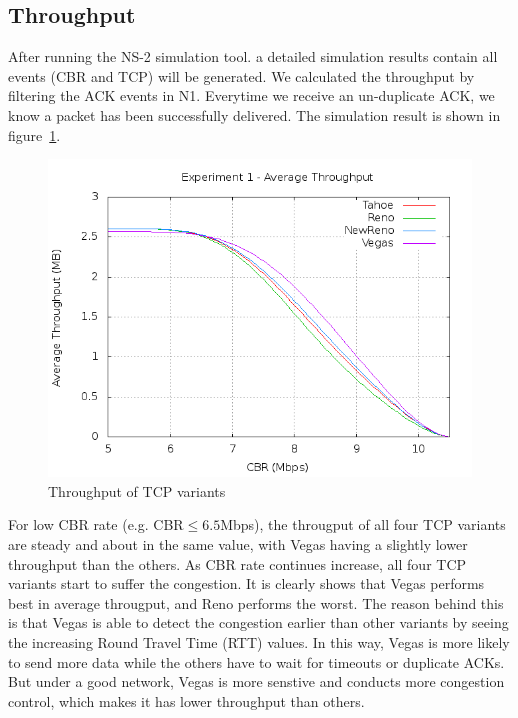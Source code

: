\documentclass[10pt, conference]{lib/IEEEtran}
\begin{document}
\subsection{Throughput}
After running the NS-2 simulation tool. a detailed simulation results 
contain all events (CBR and TCP) will be generated. We calculated the
 throughput by filtering the ACK events in N1. Everytime we receive an
 un-duplicate ACK, we know a packet has been successfully delivered. 
 The simulation result is shown in figure~\ref{fig:exp1_thp}.
\begin{figure}[!htb]
    \centering
    \includegraphics[width=0.9\linewidth]{plot/exp1-thp.png}
    \caption{Throughput of TCP variants}
    \label{fig:exp1_thp}
\end{figure}
For low CBR rate (e.g. CBR$ \le 6.5$Mbps), the througput of all four TCP 
variants are steady and about in the same value, with Vegas having a 
slightly lower throughput than the others. As CBR rate continues 
increase, all four TCP variants start to suffer the congestion. It is 
clearly shows that Vegas performs best in average througput, and Reno
performs the worst. The reason behind this is that Vegas is able to 
detect the congestion earlier than other variants by seeing the 
increasing Round Travel Time (RTT) values. In this way, Vegas is more 
likely to send more data while the others have to wait for timeouts or 
duplicate ACKs. But under a good network, Vegas is more senstive and 
conducts more congestion control, which makes it has lower throughput 
than others.
\end{document}
